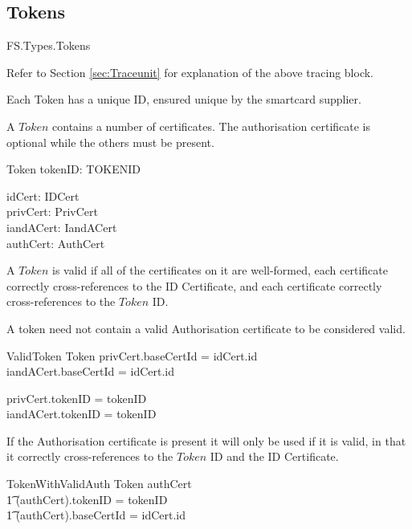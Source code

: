 \subsection{Tokens}
\label{page:firstTraceunit}
\begin{traceunit}{FS.Types.Tokens}
\end{traceunit}
\begin{Zcomment}
\item 
Refer to Section \ref{sec:Traceunit} for explanation of the
above tracing block.
\end{Zcomment}
Each Token has a unique ID, ensured unique by the smartcard supplier.
\begin{zed}
	[ TOKENID ]
\end{zed}

A $Token$ contains a number of certificates. The
authorisation certificate is optional while the others must be present.
\begin{schema}{Token}
	tokenID: TOKENID

\also	idCert: IDCert
\\	privCert: PrivCert
\\	iandACert: IandACert
\\	authCert: \Optional AuthCert
\end{schema}


A $Token$ is valid if all of the certificates on it are well-formed,
each certificate correctly cross-references to the ID Certificate,
and each certificate correctly cross-references to the $Token$ ID.

A token need not contain a valid Authorisation certificate to be considered valid.

\begin{schema}{ValidToken}
	Token
\where
	privCert.baseCertId = idCert.id
\\	iandACert.baseCertId = idCert.id

\also	privCert.tokenID = tokenID
\\	iandACert.tokenID = tokenID
\end{schema}

If the Authorisation certificate is present it will only be used if it
is valid, in that it correctly cross-references to the $Token$ ID and
the ID Certificate.

\begin{schema}{TokenWithValidAuth}
	Token
\where
        authCert \neq \Nil 
\\      \t1    \land  (\The authCert).tokenID = tokenID
\\	\t1    \land  (\The authCert).baseCertId = idCert.id
\end{schema}

